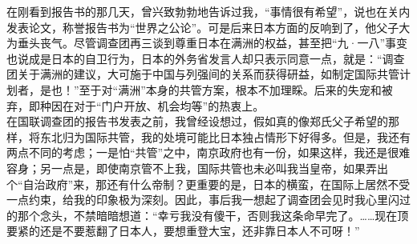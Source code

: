 在刚看到报告书的那几天，曾兴致勃勃地告诉过我，“事情很有希望”，说也在关内发表论文，称誉报告书为“世界之公论”。可是后来日本方面的反响到了，他父子大为垂头丧气。尽管调查团再三谈到尊重日本在满洲的权益，甚至把“九·一八”事变也说成是日本的自卫行为，日本的外务省发言人却只表示同意一点，就是：“调查团关于满洲的建议，大可施于中国与列强间的关系而获得研益，如制定国际共管计划者，是也！”至于对“满洲”本身的共管方案，根本不加理睬。后来的失宠和被弃，即种因在对于“门户开放、机会均等”的热衷上。\\

在国联调查团的报告书发表之前，我曾经设想过，假如真的像郑氏父子希望的那样，将东北归为国际共管，我的处境可能比日本独占情形下好得多。但是，我还有两点不同的考虑；一是怕“共管”之中，南京政府也有一份，如果这样，我还是很难容身；另一点是，即使南京管不上我，国际共管也未必叫我当皇帝，如果弄出个“自治政府”来，那还有什么帝制？更重要的是，日本的横蛮，在国际上居然不受一点约束，给我的印象极为深刻。因此，事后我一想起了调查团会见时我心里闪过的那个念头，不禁暗暗想道：“幸亏我没有傻干，否则我这条命早完了。……现在顶要紧的还是不要惹翻了日本人，要想重登大宝，还非靠日本人不可呀！”
